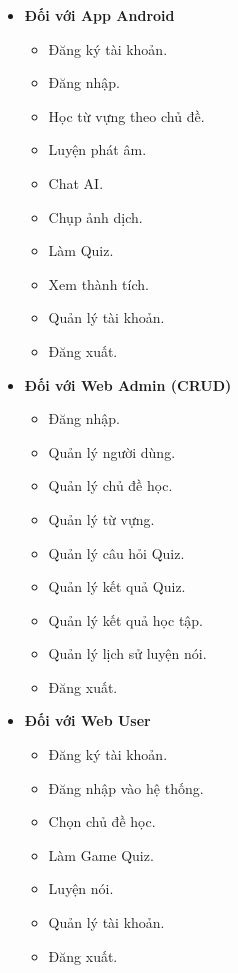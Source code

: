 \begin{itemize}[label=$\diamond$,leftmargin=1.2cm,itemsep=0.35cm]
	
	\item \textbf{Đối với App Android}
	
	\begin{itemize}[label=\textbullet,leftmargin=1.2cm,itemsep=0.15cm]
		\item Đăng ký tài khoản.
		\item Đăng nhập.
		\item Học từ vựng theo chủ đề.
		\item Luyện phát âm.
		\item Chat AI.
		\item Chụp ảnh dịch.
		\item Làm Quiz.
		\item Xem thành tích.
		\item Quản lý tài khoản.
		\item Đăng xuất.
	\end{itemize}
	
	\item \textbf{Đối với Web Admin (CRUD)}
	
	\begin{itemize}[label=\textbullet,leftmargin=1.2cm,itemsep=0.15cm]
		\item Đăng nhập.
		\item Quản lý người dùng.
		\item Quản lý chủ đề học.
		\item Quản lý từ vựng.
		\item Quản lý câu hỏi Quiz.
		\item Quản lý kết quả Quiz.
		\item Quản lý kết quả học tập.
		\item Quản lý lịch sử luyện nói.
		\item Đăng xuất.
	\end{itemize}
	
	\item \textbf{Đối với Web User}
	
	\begin{itemize}[label=\textbullet,leftmargin=1.2cm,itemsep=0.15cm]
		\item Đăng ký tài khoản.
		\item Đăng nhập vào hệ thống.
		\item Chọn chủ đề học.
		\item Làm Game Quiz.
		\item Luyện nói.
		\item Quản lý tài khoản.
		\item Đăng xuất.
	\end{itemize}
	
\end{itemize}

